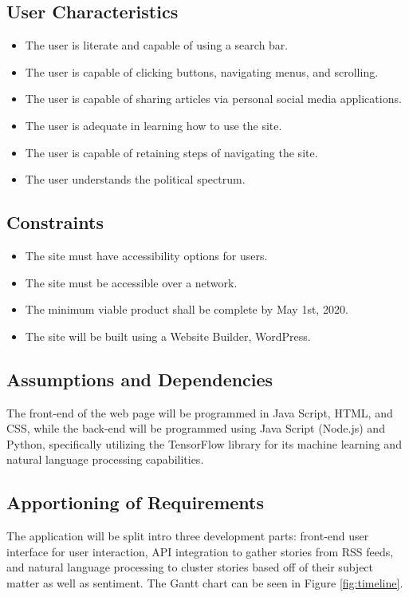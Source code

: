 \documentclass[onecolumn, draftclsnofoot,10pt, compsoc]{IEEEtran}
\begin{document}
\subsection{User Characteristics}
\begin  {itemize}
\item The user is literate and capable of using a search bar.
\item The user is capable of clicking buttons, navigating menus, and scrolling.
\item The user is capable of sharing articles via personal social media applications.
\item The user is adequate in learning how to use the site.
\item The user is capable of retaining steps of navigating the site.
\item The user understands the political spectrum.
\end {itemize}

\subsection{Constraints}
\begin {itemize}
\item The site must have accessibility options for users. 
\item The site must be accessible over a network.
\item The minimum viable product shall be complete by May 1st, 2020.
\item The site will be built using a Website Builder, WordPress.
\end {itemize}

\subsection{Assumptions and Dependencies}
The front-end of the web page will be programmed in Java Script, HTML, and CSS, while the back-end will be programmed using Java Script (Node.js) and Python, specifically utilizing the TensorFlow library for its machine learning and natural language processing capabilities.


\subsection{Apportioning of Requirements}
The application will be split intro three development parts: front-end user interface for user interaction, API integration to gather stories from RSS feeds, and natural language processing to cluster stories based off of their subject matter as well as sentiment.
The Gantt chart can be seen in Figure \ref{fig:timeline}.
\end{document}
